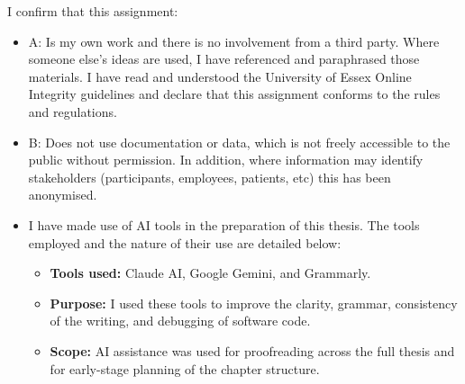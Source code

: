 I confirm that this assignment:

\begin{itemize}
\item A: Is my own work and there is no involvement from a third party. Where someone else's ideas are used, I have referenced and paraphrased those materials. I have read and understood the University of Essex Online Integrity guidelines and declare that this assignment conforms to the rules and regulations.

\item B: Does not use documentation or data, which is not freely accessible to the public without permission. In addition, where information may identify stakeholders (participants, employees, patients, etc) this has been anonymised.


\item I have made use of AI tools in the preparation of this thesis. The tools employed and the nature of their use are detailed below:
  \begin{itemize}
    \item \textbf{Tools used:} Claude AI, Google Gemini, and Grammarly.
    \item \textbf{Purpose:} I used these tools to improve the clarity, grammar, consistency of the writing, and debugging of software code.
    \item \textbf{Scope:} AI assistance was used for proofreading across the full thesis and for early-stage planning of the chapter structure.
  \end{itemize}
\end{itemize}

